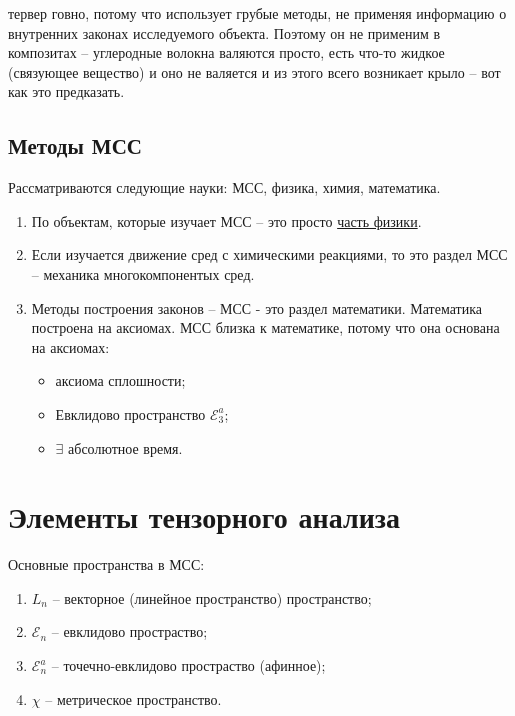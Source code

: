 \begin{itemize}
\begin{enumerate}
\begin{itemize}
            тервер говно, потому что использует грубые методы, не применяя информацию о внутренних
            законах исследуемого объекта. Поэтому он не применим в композитах -- углеродные волокна 
            валяются просто, есть что-то жидкое (связующее вещество) и оно не валяется и из этого 
            всего возникает крыло -- вот как это предказать.
        \end{itemize}
    \end{enumerate}
\end{itemize}

\subsection{Методы МСС}

Рассматриваются следующие науки: МСС, физика, химия, математика.

\begin{enumerate}
  \item По объектам, которые изучает МСС -- это просто \underline{часть физики}.

  \item Если изучается движение сред с химическими реакциями, то это раздел МСС -- механика
    многокомпонентых сред.

  \item Методы построения законов -- МСС - это раздел математики. Математика построена на аксиомах.
    МСС близка к математике, потому что она основана на аксиомах:
    \begin{itemize}
      \item аксиома сплошности;
      \item Евклидово пространство $\mathcal{E}_3^a$;
      \item $\exists$ абсолютное время.
    \end{itemize}
\end{enumerate}


\section{Элементы тензорного анализа}

Основные пространства в МСС:
\begin{enumerate}
  \item $L_n$ -- векторное (линейное пространство) пространство;
  \item $\mathcal{E}_n$ -- евклидово простраство;
  \item $\mathcal{E}_n^a$ -- точечно-евклидово простраство (афинное);
  \item $\chi$ -- метрическое пространство.
\end{enumerate}

